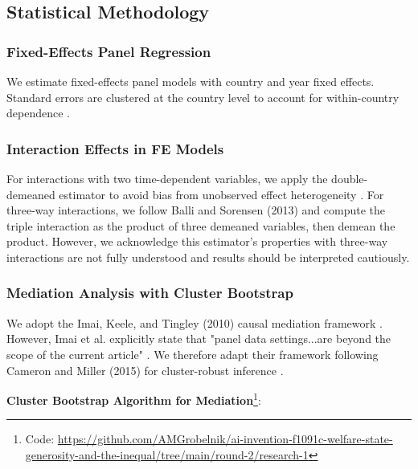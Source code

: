 \documentclass[11pt,letterpaper]{article}
\begin{document}
\subsection{Statistical Methodology}

\subsubsection{Fixed-Effects Panel Regression}

We estimate fixed-effects panel models with country and year fixed effects. Standard errors are clustered at the country level to account for within-country dependence \cite{Cameron2015}.

\subsubsection{Interaction Effects in FE Models}

For interactions with two time-dependent variables, we apply the double-demeaned estimator to avoid bias from unobserved effect heterogeneity \cite{Balli2013}. For three-way interactions, we follow Balli and Sorensen (2013) and compute the triple interaction as the product of three demeaned variables, then demean the product. However, we acknowledge this estimator's properties with three-way interactions are not fully understood and results should be interpreted cautiously.

\subsubsection{Mediation Analysis with Cluster Bootstrap}

We adopt the Imai, Keele, and Tingley (2010) causal mediation framework \cite{Imai2010}. However, Imai et al. explicitly state that "panel data settings...are beyond the scope of the current article" \cite[309]{Imai2010}. We therefore adapt their framework following Cameron and Miller (2015) for cluster-robust inference \cite{Cameron2015}.

\textbf{Cluster Bootstrap Algorithm for Mediation}\footnote{Code: \url{https://github.com/AMGrobelnik/ai-invention-f1091c-welfare-state-generosity-and-the-inequal/tree/main/round-2/research-1}}:
\end{document}
